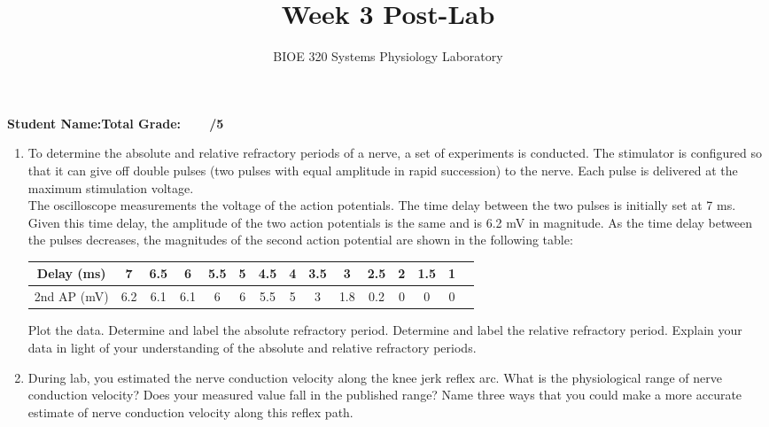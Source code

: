 \documentclass{article}
\title{Week 3 Post-Lab}
\author{BIOE 320 Systems Physiology Laboratory}
\date{}
\begin{document}
\maketitle
\large

\textbf{Student Name:}\hfill 	\textbf{Total Grade:\ \ \ \ /5}\vspace{0.5cm}

\begin{enumerate}
	\item To determine the absolute and relative refractory periods of a nerve, a set of experiments is conducted. The stimulator is configured so that it can give off double pulses (two pulses with equal amplitude in rapid succession) to the nerve. Each pulse is delivered at the maximum stimulation voltage.\\
	
	The oscilloscope measurements the voltage of the action potentials. The time delay between the two pulses is initially set at 7 ms. Given this time delay, the amplitude of the two action potentials is the same and is 6.2 mV in magnitude. As the time delay between the pulses decreases, the magnitudes of the second action potential are shown in the following table:\\
	\normalsize
	\begin{table}[h]
	\centering
	\begin{tabular}[h!]{c|cccccccccccccc}
	\toprule
	Delay (ms) & 7 & 6.5 & 6 & 5.5 & 5 & 4.5 & 4 & 3.5 & 3 & 2.5 & 2 & 1.5 & 1\\
	\midrule
	2nd AP (mV) & 6.2 & 6.1 & 6.1 & 6 & 6 & 5.5 & 5 & 3 & 1.8 & 0.2 & 0 & 0 & 0\\
	\bottomrule
	\end{tabular}
	\end{table}
	\large
	
	Plot the data. Determine and label the absolute refractory period. Determine and label the relative refractory period. Explain your data in light of your understanding of the absolute and relative refractory periods.
	\item During lab, you estimated the nerve conduction velocity along the knee jerk reflex arc. What is the physiological range of nerve conduction velocity? Does your measured value fall in the published range? Name three ways that you could make a more accurate estimate of nerve conduction velocity along this reflex path.
		
\end{enumerate}
\end{document}

